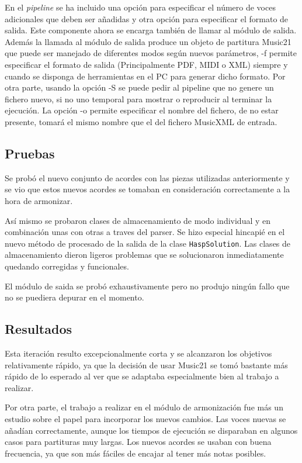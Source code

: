 En el \textit{pipeline} se ha incluido una opción para especificar el número de voces adicionales que deben ser añadidas y otra opción para especificar el formato de salida. Este componente ahora se encarga también de llamar al módulo de salida.
Además la llamada al módulo de salida produce un objeto de partitura Music21 que puede ser manejado de diferentes modos según nuevos parámetros, -f permite especificar el formato de salida (Principalmente PDF, MIDI o XML) siempre y cuando se disponga de herramientas en el PC para generar dicho formato. Por otra parte, usando la opción -S se puede pedir al pipeline que no genere un fichero nuevo, si no uno temporal para mostrar o reproducir al terminar la ejecución. La opción -o permite especificar el nombre del fichero, de no estar presente, tomará el mismo nombre que el del fichero MusicXML de entrada.

\subsection{Pruebas}
Se probó el nuevo conjunto de acordes con las piezas utilizadas anteriormente y se vio que estos nuevos acordes se tomaban en consideración correctamente a la hora de armonizar.

Así mismo se probaron clases de almacenamiento de modo individual y en combinación unas con otras a traves del parser. Se hizo especial hincapié en el nuevo método de procesado de la salida de la clase \texttt{HaspSolution}. Las clases de almacenamiento dieron ligeros problemas que se solucionaron inmediatamente quedando corregidas y funcionales.

El módulo de saida se probó exhaustivamente pero no produjo ningún fallo que no se puediera depurar en el momento.

\subsection{Resultados}
Esta iteración resulto excepcionalmente corta y se alcanzaron los objetivos relativamente rápido, ya que la decisión de usar Music21 se tomó bastante más rápido de lo esperado al ver que se adaptaba especialmente bien al trabajo a realizar.

Por otra parte, el trabajo a realizar en el módulo de armonización fue más un estudio sobre el papel para incorporar los nuevos cambios. Las voces nuevas se añadían correctamente, aunque los tiempos de ejecución se disparaban en algunos casos para partituras muy largas. Los nuevos acordes se usaban con buena frecuencia, ya que son más fáciles de encajar al tener más notas posibles.

